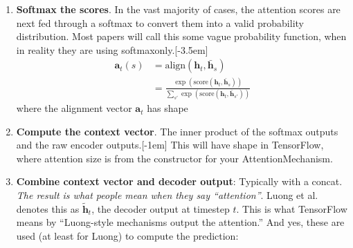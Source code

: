 \documentclass[11pt]{article}
\renewcommand\vec[2][]{\bm{#2}_{#1}}
\begin{document}
\begin{enumerate}
	\item \textbf{Softmax the scores}. In the vast majority of cases, the attention scores are next fed through a softmax to convert them into a valid probability distribution. Most papers will call this some vague probability function, when in reality they are using softmaxonly.[-3.5em]
	\begin{align}
	\vec[t]{a}(s) &= \text{align}(\vec[t]{h}, \vec[s]{\bar h}) \\
	&= \frac{\exp(\text{score}(\vec[t]{h}, \vec[s]{\bar h}) )}{
		\sum_{s'} \exp(\text{score}(\vec[t]{h}, \vec[s']{\bar h}) )
	}
	\end{align}
	where the alignment vector $\vec[t]{a}$ has shape 
		
	\item \textbf{Compute the context vector}. The inner product of the softmax outputs and the raw encoder outputs.[-1em]
	This will have shape  in TensorFlow, where attention size is from the constructor for your AttentionMechanism.
	
	\item \textbf{Combine context vector and decoder output}: Typically with a concat. \textit{The result is what people mean when they say ``attention''}. Luong et al. denotes this as $\vec[t]{\tilde h}$, the decoder output at timestep $t$. This is what TensorFlow means by ``Luong-style mechanisms output the attention.'' And yes, these are used (at least for Luong) to compute the prediction:
	\graybox{
		\vec[t]{\tilde h} &= \tanh\left( \matr[c]{W}\left[
			\vec[t]{c}, ~ \vec[t]{h}
		 \right]   \right) \\
		 p( y_t \mid y_{<t}, x  ) &= \text{softmax}(
			 \matr[s]{W}  \vec[t]{\tilde h}
		 )
		}
\end{enumerate}










\end{document}
